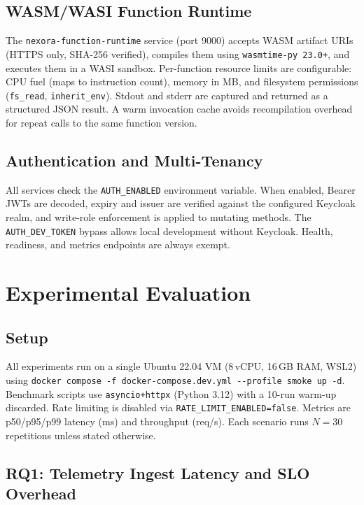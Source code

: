 \documentclass[twocolumn,smallextended]{svjour3}
\begin{document}
\subsection{WASM/WASI Function Runtime}
\label{sec:wasm-impl}
The \texttt{nexora-function-runtime} service (port 9000) accepts WASM
artifact URIs (HTTPS only, SHA-256 verified), compiles them using
\texttt{wasmtime-py~23.0+}, and executes them in a WASI sandbox.
Per-function resource limits are configurable: CPU fuel (maps to instruction
count), memory in MB, and filesystem permissions (\texttt{fs\_read},
\texttt{inherit\_env}). Stdout and stderr are captured and returned as a
structured JSON result. A warm invocation cache avoids recompilation overhead
for repeat calls to the same function version.

\subsection{Authentication and Multi-Tenancy}
All services check the \texttt{AUTH\_ENABLED} environment variable.
When enabled, Bearer JWTs are decoded, expiry and issuer are verified
against the configured Keycloak realm, and write-role enforcement is applied
to mutating methods. The \texttt{AUTH\_DEV\_TOKEN} bypass allows local
development without Keycloak. Health, readiness, and metrics endpoints are
always exempt.

\section{Experimental Evaluation}
\label{sec:evaluation}

\subsection{Setup}
All experiments run on a single Ubuntu 22.04 VM (8\,vCPU, 16\,GB RAM, WSL2)
using \texttt{docker compose -f docker-compose.dev.yml -{}-profile smoke up -d}.
Benchmark scripts use \texttt{asyncio+httpx} (Python 3.12) with a 10-run
warm-up discarded. Rate limiting is disabled via \texttt{RATE\_LIMIT\_ENABLED=false}.
Metrics are p50/p95/p99 latency (ms) and throughput (req/s).
Each scenario runs $N\!=\!30$ repetitions unless stated otherwise.

\subsection{RQ1: Telemetry Ingest Latency and SLO Overhead}
\label{sec:bench-slo}
\end{document}

